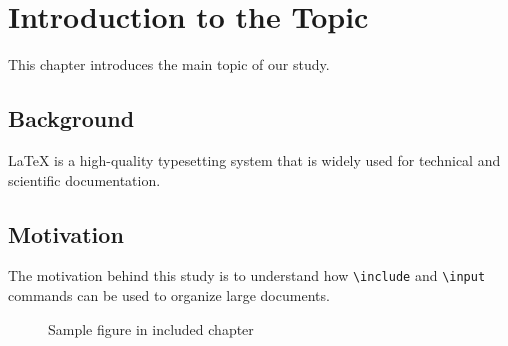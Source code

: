 \section{Introduction to the Topic}
\label{sec:intro}

This chapter introduces the main topic of our study.

\subsection{Background}
LaTeX is a high-quality typesetting system that is widely used for technical and scientific documentation.

\subsection{Motivation}
The motivation behind this study is to understand how \texttt{\textbackslash include} and \texttt{\textbackslash input} 
commands can be used to organize large documents.

\begin{figure}[h]
    \centering
    \caption{Sample figure in included chapter}
    \label{fig:sample}
\end{figure}
